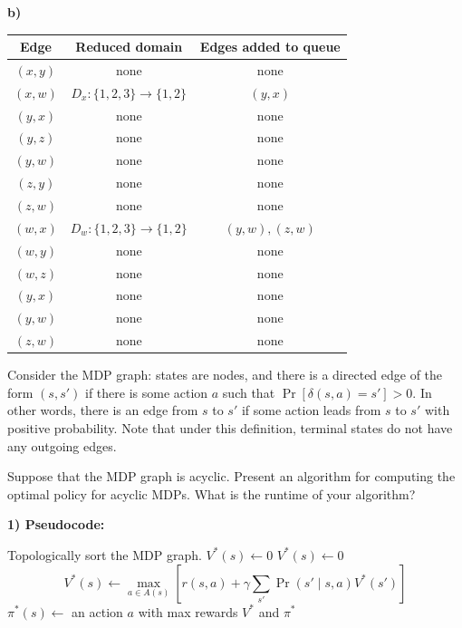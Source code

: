 \documentclass[10pt,a4paper,answers]{exam}
\begin{document}
{\begin{questions}
\begin{solution}
\textbf{b)}
\begin{center}
\renewcommand{\arraystretch}{1.5}
\begin{tabular}{|c|c|c|}
\hline
\textbf{Edge} & \textbf{Reduced domain} & \textbf{Edges added to queue} \\
\hline
$(x,y)$ & none & none \\
\hline
$(x,w)$ & $D_x : \{1,2,3\} \to \{1,2\}$ & $(y,x)$ \\
\hline
$(y,x)$ & none & none \\
\hline
$(y,z)$ & none & none \\
\hline
$(y,w)$ & none & none \\
\hline
$(z,y)$ & none & none \\
\hline
$(z,w)$ & none & none \\
\hline
$(w,x)$ & $D_w : \{1,2,3\} \to \{1,2\}$ & $(y,w), (z,w)$ \\
\hline
$(w,y)$ & none & none \\
\hline
$(w,z)$ & none & none \\
\hline
$(y,x)$ & none & none \\
\hline
$(y,w)$ & none & none \\
\hline
$(z,w)$ & none & none \\
\hline
\end{tabular}
\end{center}

\end{solution}



\question[25] 
Consider the MDP graph: states are nodes, and there is a directed edge of the form $(s,s')$ if there is some action $a$ such that $\Pr[\delta(s,a) = s'] > 0$. In other words, there is an edge from $s$ to $s'$ if some action leads from $s$ to $s'$ with positive probability. 
Note that under this definition, terminal states do not have any outgoing edges.

Suppose that the MDP graph is acyclic. Present an algorithm for computing the optimal policy for acyclic MDPs. What is the runtime of your algorithm? 

\begin{solution}


\noindent\textbf{1) Pseudocode:}

\begin{algorithmic}[1]
\State Topologically sort the MDP graph.
    \State $V^*(s) \gets 0$
\EndFor
\Statex
{}
        \State $V^*(s) \gets 0$
    \Else
        \State
        \[
        V^*(s) \gets 
        \max_{a \in A(s)}
        \left[
        r(s,a) + \gamma \sum_{s'} \Pr(s' \mid s,a)V^*(s')
        \right]
        \]
        \State $\pi^*(s) \gets$ an action $a$ with max rewards
    \EndIf
\EndFor
\Statex
\State \Return $V^*$ and $\pi^*$
\end{algorithmic}


\end{solution}
\end{questions}}
\end{document}
